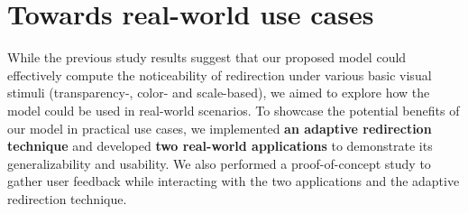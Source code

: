 \section{Towards real-world use cases}

While the previous study results suggest that our proposed model could effectively compute the noticeability of redirection under various basic visual stimuli (transparency-, color- and scale-based), we aimed to explore how the model could be used in real-world scenarios.
To showcase the potential benefits of our model in practical use cases, we implemented \textbf{an adaptive redirection technique} and developed \textbf{two real-world applications} to demonstrate its generalizability and usability.
We also performed a proof-of-concept study to gather user feedback while interacting with the two applications and the adaptive redirection technique.



